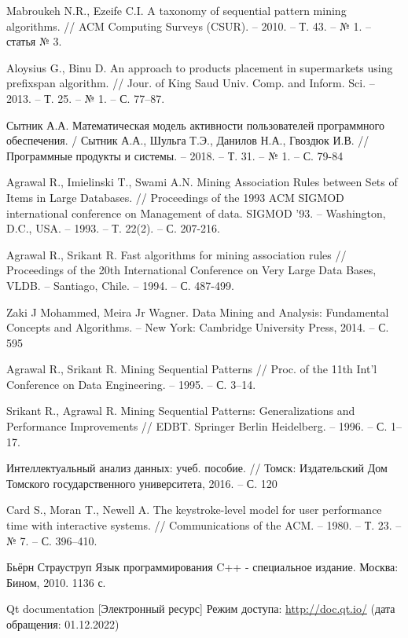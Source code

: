 \begin{thebibliography}{1}
	Mabroukeh N.R., Ezeife C.I.
	A taxonomy of sequential pattern mining algorithms.
	// ACM Computing Surveys (CSUR). -- 2010. -- Т. 43. -- № 1. -- статья № 3.
	
	Aloysius G., Binu D.
	An approach to products placement in supermarkets using prefixspan algorithm.
	// Jour. of King Saud Univ. Comp. and Inform. Sci. -- 2013. -- Т. 25. -- № 1. -- С. 77–87.
	
	Сытник А.А.
	Математическая модель активности пользователей программного обеспечения. /
	Сытник А.А., Шульга Т.Э., Данилов Н.А., Гвоздюк И.В.
	// Программные продукты и системы. -- 2018. -- Т. 31. -- № 1. -- С. 79-84 
	
	Agrawal R., Imielinski T., Swami A.N.
	Mining Association Rules between Sets of Items in Large Databases.
	// Proceedings of the 1993 ACM SIGMOD international conference on Management of data. SIGMOD '93. -- Washington, D.C., USA. -- 1993. -- Т. 22(2). -- С. 207-216.
	
	Agrawal R., Srikant R.
	Fast algorithms for mining association rules
	// Proceedings of the 20th International Conference on Very Large Data Bases, VLDB. -- Santiago, Chile. -- 1994. -- С. 487-499.
	
	Zaki J Mohammed, Meira Jr Wagner. Data Mining and Analysis: Fundamental Concepts and Algorithms. -- New York: Cambridge University Press, 2014. -- С. 595
	
	Agrawal R., Srikant R. Mining Sequential Patterns // Proc. of the 11th Int’l
	Conference on Data Engineering. -- 1995. -- С. 3–14.
	
	Srikant R., Agrawal R. Mining Sequential Patterns: Generalizations and
	Performance Improvements // EDBT. Springer Berlin Heidelberg. -- 1996.
	-- С. 1–17.
	
	Интеллектуальный анализ данных: учеб. пособие. //
	Томск: Издательский Дом Томского государственного
	университета, 2016. -- С. 120
	
	Card S., Moran T., Newell A.
	The keystroke-level model for user performance time with interactive systems.
	// Communications of the ACM. -- 1980. -- Т. 23. -- № 7. -- С. 396–410.
	
	
	Бьёрн Страуструп Язык программирования C++ - специальное издание. Москва: Бином, 2010. 1136 с.
	
	Qt documentation [Электронный ресурс]
	Режим доступа: \url{http://doc.qt.io/}
	(дата обращения: 01.12.2022)
	
	
\end{thebibliography}
